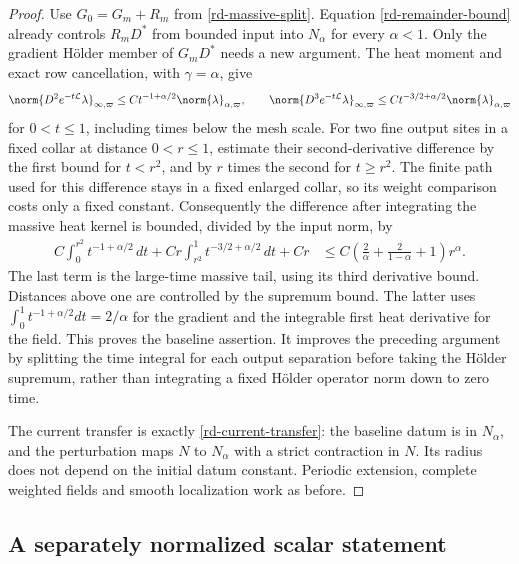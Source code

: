 \begin{proof}
Use $G_0=G_m+R_m$ from \eqref{rd-massive-split}.
Equation \eqref{rd-remainder-bound} already controls $R_mD^*$
from bounded input into $N_\alpha$ for every $\alpha<1$.
Only the gradient H\"older member of $G_mD^*$ needs a new
argument. The heat moment and exact row cancellation, with
$\gamma=\alpha$, give
\[
 \norm{D^2e^{-t\mathcal L}\lambda}_{\infty,\varpi}
       \le Ct^{-1+\alpha/2}\norm{\lambda}_{\alpha,\varpi},
 \qquad
 \norm{D^3e^{-t\mathcal L}\lambda}_{\infty,\varpi}
       \le Ct^{-3/2+\alpha/2}\norm{\lambda}_{\alpha,\varpi}
\]
for $0<t\le1$, including times below the mesh scale.
For two fine output sites in a fixed collar at distance
$0<r\le1$, estimate their second-derivative difference by the
first bound for $t<r^2$, and by $r$ times the second for $t\ge r^2$.
The finite path used for this difference stays in a fixed enlarged
collar, so its weight comparison costs only a fixed constant.
Consequently the difference after integrating the massive heat
kernel is bounded, divided by the input norm, by
\begin{align}
 C\int_0^{r^2}t^{-1+\alpha/2}\,dt
 +Cr\int_{r^2}^1t^{-3/2+\alpha/2}\,dt+Cr
 &\le C\left(\frac2\alpha+
                     \frac2{1-\alpha}+1\right)r^\alpha.
 \label{ss-split-integral}
\end{align}
The last term is the large-time massive tail, using its third
derivative bound. Distances above one are controlled by the
supremum bound. The latter uses
$\int_0^1t^{-1+\alpha/2}dt=2/\alpha$ for the gradient and the
integrable first heat derivative for the field. This proves the
baseline assertion. It improves the preceding argument by
splitting the time integral for each output separation before
taking the H\"older supremum, rather than integrating a fixed
H\"older operator norm down to zero time.

The current transfer is exactly \eqref{rd-current-transfer}:
the baseline datum is in $N_\alpha$, and the perturbation maps
$N$ to $N_\alpha$ with a strict contraction in $N$. Its radius
does not depend on the initial datum constant. Periodic extension,
complete weighted fields and smooth localization work as before.
\end{proof}

\subsection{A separately normalized scalar statement}

